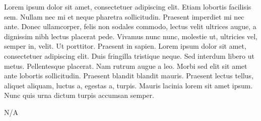 \documentclass[typewriter]{bureau_po_report}
\begin{document}

Lorem ipsum dolor sit amet, consectetuer adipiscing elit. Etiam lobortis facilisis sem. Nullam nec
mi et neque pharetra sollicitudin. Praesent imperdiet mi nec ante. Donec ullamcorper, felis non
sodales commodo, lectus velit ultrices augue, a dignissim nibh lectus placerat pede. Vivamus nunc
nunc, molestie ut, ultricies vel, semper in, velit. Ut porttitor. Praesent in sapien. Lorem ipsum
dolor sit amet, consectetuer adipiscing elit. Duis fringilla tristique neque. Sed interdum libero
ut metus. Pellentesque placerat. Nam rutrum augue a leo. Morbi sed elit sit amet ante lobortis
sollicitudin. Praesent blandit blandit mauris. Praesent lectus tellus, aliquet aliquam, luctus a,
egestas a, turpis. Mauris lacinia lorem sit amet ipsum. Nunc quis urna dictum turpis accumsan
semper.


N/A
\end{document}
